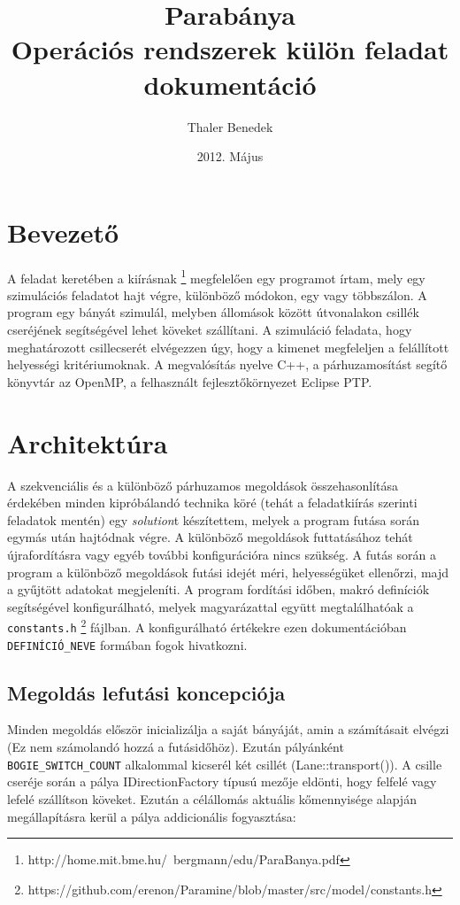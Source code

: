\documentclass[a4paper,10pt]{article}
\title{Parabánya \\ Operációs rendszerek külön feladat \\ dokumentáció}
\author{Thaler Benedek}
\date{2012. Május}
\begin{document}
\lstset{basicstyle=\ttfamily}

	\maketitle
	

	\section{Bevezető}
A feladat keretében a kiírásnak \footnote{http://home.mit.bme.hu/~bergmann/edu/ParaBanya.pdf} megfelelően egy programot írtam, mely egy szimulációs feladatot hajt végre, különböző módokon, egy vagy többszálon. A program egy bányát szimulál, melyben állomások között útvonalakon csillék cseréjének segítségével lehet köveket szállítani. A szimuláció feladata, hogy meghatározott csillecserét elvégezzen úgy, hogy a kimenet megfeleljen a felállított helyességi kritériumoknak. A megvalósítás nyelve C++, a párhuzamosítást segítő könyvtár az OpenMP, a felhasznált fejlesztőkörnyezet Eclipse PTP.

	\section{Architektúra}
A szekvenciális és a különböző párhuzamos megoldások összehasonlítása érdekében minden kipróbálandó technika köré (tehát a feladatkiírás szerinti feladatok mentén) egy \emph{solution}t készítettem, melyek a program futása során egymás után hajtódnak végre. A különböző megoldások futtatásához tehát újrafordításra vagy egyéb további konfigurációra nincs szükség. A futás során a program a különböző megoldások futási idejét méri, helyességüket ellenőrzi, majd a gyűjtött adatokat megjeleníti. A program fordítási időben, makró definíciók segítségével konfigurálható, melyek magyarázattal együtt megtalálhatóak a \texttt{constants.h} \footnote{https://github.com/erenon/Paramine/blob/master/src/model/constants.h} fájlban. A konfigurálható értékekre ezen dokumentációban \texttt{DEFINÍCIÓ\_NEVE} formában fogok hivatkozni.

    \subsection{Megoldás lefutási koncepciója}
Minden megoldás először inicializálja a saját bányáját, amin a számításait elvégzi (Ez nem számolandó hozzá a futásidőhöz). Ezután pályánként \\ \texttt{BOGIE\_SWITCH\_COUNT} alkalommal kicserél két csillét (Lane::transport()). A csille cseréje során a pálya IDirectionFactory típusú mezője eldönti, hogy felfelé vagy lefelé szállítson köveket. Ezután a célállomás aktuális kőmennyisége alapján megállapításra kerül a pálya addicionális fogyasztása:
\end{document}
